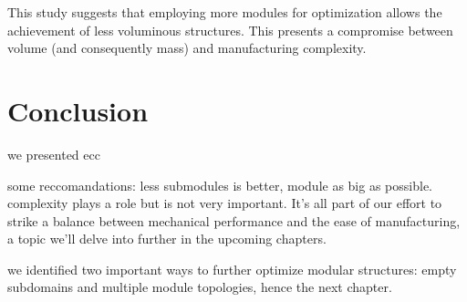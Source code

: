     This study suggests that employing more modules for optimization allows the achievement of less voluminous structures. This presents a compromise between volume (and consequently mass) and manufacturing complexity.



\section{Conclusion}
we presented ecc

some reccomandations: less submodules is better, module as big as possible. complexity plays a role but is not very important.
It's all part of our effort to strike a balance between mechanical performance and the ease of manufacturing, a topic we'll delve into further in the upcoming chapters.

we identified two important ways to further optimize modular structures: empty subdomains and multiple module topologies, hence the next chapter.